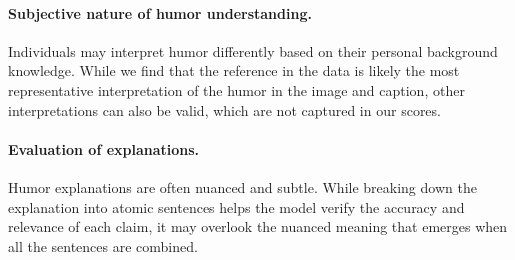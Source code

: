 \paragraph{Subjective nature of humor understanding.} Individuals may interpret humor differently based on their personal background knowledge. While we find that the reference in the data is likely the most representative interpretation of the humor in the image and caption, other interpretations can also be valid, which are not captured in our scores.

\paragraph{Evaluation of explanations.} Humor explanations are often nuanced and subtle. While breaking down the explanation into atomic sentences helps the model verify the accuracy and relevance of each claim, it may overlook the nuanced meaning that emerges when all the sentences are combined.
